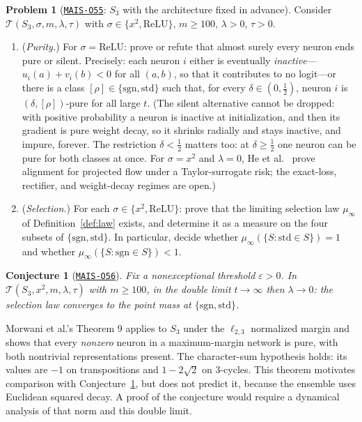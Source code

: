 \documentclass[11pt]{amsart}
\newcommand{\Oid}[1]{\href{https://github.com/lionellevine/MAIS/blob/main/open-problems/MAIS-O#1.md}{\texttt{MAIS-O#1}}}
\theoremstyle{plain}
\newtheorem{conjecture}[theorem]{Conjecture}
\theoremstyle{definition}
\newtheorem{problem}[theorem]{Problem}
\begin{document}
\begin{problem}[\Oid{55}: $S_3$ with the architecture fixed in advance]\label{prob:s3}
Consider $\mathcal{T}(S_3, \sigma, m, \lambda, \tau)$ with $\sigma \in \{x^2, \mathrm{ReLU}\}$, $m \geq 100$, $\lambda > 0$, $\tau > 0$.
\begin{enumerate}
\item[(a)] (\emph{Purity.}) For $\sigma = \mathrm{ReLU}$: prove or refute that almost surely every neuron ends pure or silent. Precisely: each neuron $i$ either is eventually \emph{inactive}---$u_i(a) + v_i(b) < 0$ for all $(a,b)$, so that it contributes to no logit---or there is a class $[\rho] \in \{\mathrm{sgn}, \mathrm{std}\}$ such that, for every $\delta \in (0,\tfrac12)$, neuron $i$ is $(\delta,[\rho])$-pure for all large $t$. (The silent alternative cannot be dropped: with positive probability a neuron is inactive at initialization, and then its gradient is pure weight decay, so it shrinks radially and stays inactive, and impure, forever. The restriction $\delta < \tfrac12$ matters too: at $\delta \geq \tfrac12$ one neuron can be pure for both classes at once. For $\sigma=x^2$ and $\lambda=0$, He et al.~\cite{he2026spectral} prove alignment for projected flow under a Taylor-surrogate risk; the exact-loss, rectifier, and weight-decay regimes are open.)
\item[(b)] (\emph{Selection.}) For each $\sigma \in \{x^2, \mathrm{ReLU}\}$: prove that the limiting selection law $\mu_\infty$ of Definition~\ref{def:law} exists, and determine it as a measure on the four subsets of $\{\mathrm{sgn}, \mathrm{std}\}$. In particular, decide whether $\mu_\infty(\{S : \mathrm{std} \in S\}) = 1$ and whether $\mu_\infty(\{S : \mathrm{sgn} \in S\}) < 1$.
\end{enumerate}
\end{problem}

\begin{conjecture}[\Oid{56}]\label{conj:s3}
Fix a nonexceptional threshold $\varepsilon>0$. In $\mathcal{T}(S_3, x^2, m, \lambda, \tau)$ with $m \geq 100$, in the double limit $t \to \infty$ then $\lambda \to 0$: the selection law converges to the point mass at $\{\mathrm{sgn}, \mathrm{std}\}$.
\end{conjecture}

Morwani et al.'s Theorem 9 \cite{morwani2024} applies to $S_3$ under the $\ell_{2,3}$ normalized margin and shows that every \emph{nonzero} neuron in a maximum-margin network is pure, with both nontrivial representations present. The character-sum hypothesis holds: its values are $-1$ on transpositions and $1-2\sqrt2$ on $3$-cycles. This theorem motivates comparison with Conjecture~\ref{conj:s3}, but does not predict it, because the ensemble uses Euclidean squared decay. A proof of the conjecture would require a dynamical analysis of that norm and this double limit.
\end{document}
